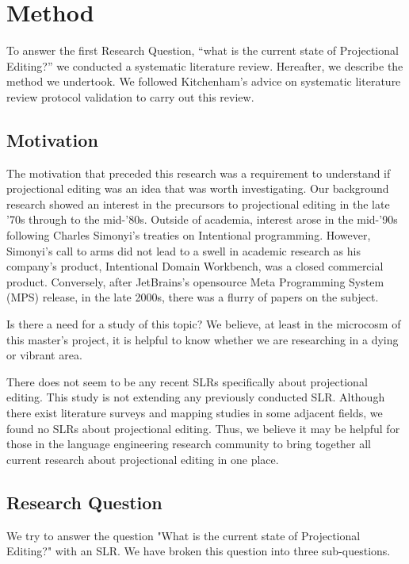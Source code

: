 \section{Method}
\label{section:slr_method}

To answer the first Research Question, ``what is the current state of Projectional Editing?'' we conducted a systematic literature review.
Hereafter, we describe the method we undertook. 
We followed Kitchenham's\cite{kitchenham2015evidence} advice on systematic literature review protocol validation to carry out this review.

\subsection{Motivation}
The motivation that preceded this research was a requirement to understand if projectional editing was an idea that was worth investigating.
Our background research showed an interest in the precursors to projectional editing in the late '70s through to the mid-'80s.
Outside of academia, interest arose in the mid-'90s following Charles Simonyi's treaties on Intentional programming.
However, Simonyi's call to arms did not lead to a swell in academic research as his company's product, Intentional Domain Workbench, was a closed commercial product.
Conversely, after JetBrains's opensource Meta Programming System (MPS) release, in the late 2000s, there was a flurry of papers on the subject.

Is there a need for a study of this topic? 
We believe, at least in the microcosm of this master's project, it is helpful to know whether we are researching in a dying or vibrant area.

There does not seem to be any recent SLRs specifically about projectional editing.
This study is not extending any previously conducted SLR.
Although there exist literature surveys and mapping studies in some adjacent fields, we found no SLRs about projectional editing.
Thus, we believe it may be helpful for those in the language engineering research community to bring together all current research about projectional editing in one place.

\subsection{Research Question}
We try to answer the question "What is the current state of Projectional Editing?" with an SLR. 
We have broken this question into three sub-questions.

